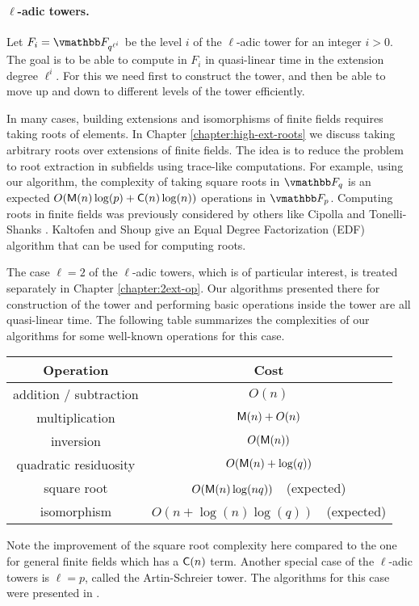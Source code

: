 \paragraph{$\ell$-adic towers.} Let $F_i = \F_{q^{\ell^i}}$ be the level $i$ of the $\ell$-adic 
tower for an integer $i > 0$. The goal is to be able to compute in $F_i$ in quasi-linear time in 
the extension degree $\ell^i$. For this we need first to construct the tower, and then be able to 
move up and down to different levels of the tower efficiently. 

In many cases, building extensions and isomorphisms of finite fields requires taking roots of 
elements. In Chapter \ref{chapter:high-ext-roots} we discuss taking arbitrary roots over extensions 
of finite fields. The idea is to reduce the problem to root extraction in subfields using 
trace-like computations. For example, using our algorithm, the complexity of taking square roots in 
$\F_q$ is an expected $O(\mathsf{M}(n)\log(p) + \mathsf{C}(n)\log(n))$ operations in $\F_p$. Computing roots in 
finite fields was previously considered by others like Cipolla \cite{Williams72} and Tonelli-Shanks 
\cite{Shanks1972}. Kaltofen and Shoup \cite{KaltofenShoup1997} give an Equal Degree Factorization 
(EDF) algorithm that can be used for computing roots.

The case $\ell = 2$ of the $\ell$-adic towers, which is of particular interest, is treated 
separately in Chapter \ref{chapter:2ext-op}. Our algorithms presented there for construction of the 
tower and performing basic operations inside the tower are all quasi-linear time. The following 
table summarizes the complexities of our algorithms for some well-known operations for this case.

\begin{center}
	\begin{tabular}{c|c}
		Operation & Cost \\
		\hline
		addition / subtraction & $O(n)$\\
		multiplication & $\mathsf{M}(n)+O(n)$\\
		inversion & $O(\mathsf{M}(n))$\\
		quadratic residuosity & $O(\mathsf{M}(n)+\log(q))$ \\
		square root &  $O(\mathsf{M}(n)\log(nq))$\ \ (expected) \\
		isomorphism &  $O(n + \log(n)\log(q))$\ \ (expected)
	\end{tabular}
\end{center}
Note the improvement of the square root complexity here compared to the one for general finite 
fields which has a $\mathsf{C}(n)$ term. Another special case of the $\ell$-adic towers is $\ell = p$, 
called the Artin-Schreier tower. The algorithms for this case were presented in \cite{DeSc12}.

